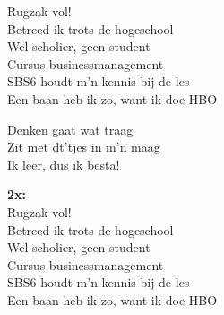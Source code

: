 Rugzak vol!\\
Betreed ik trots de hogeschool\\
Wel scholier, geen student\\
Cursus businessmanagement\\
SBS6 houdt m'n kennis bij de les\\
Een baan heb ik zo, want ik doe HBO

Denken gaat wat traag\\
Zit met dt'tjes in m'n maag\\
Ik leer, dus ik besta!

\textbf{2x:}\\
Rugzak vol!\\
Betreed ik trots de hogeschool\\
Wel scholier, geen student\\
Cursus businessmanagement\\
SBS6 houdt m'n kennis bij de les\\
Een baan heb ik zo, want ik doe HBO
